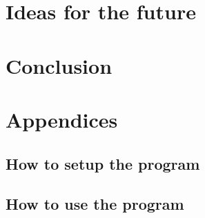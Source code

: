 \documentclass[12pt, twoside, openany]{report}
\theoremstyle{definition}
\begin{document}
\chapter{Ideas for the future}
\chapter{Conclusion}

\chapter {Appendices}
\section{How to setup the program}
\section {How to use the program}


\end{document}

